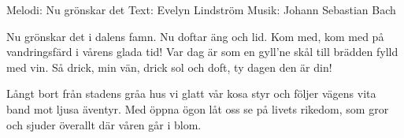 \begin{song}

\begin{songmeta}
Melodi: Nu grönskar det
Text: Evelyn Lindström
Musik: Johann Sebastian Bach
\end{songmeta}

\begin{songtext}
Nu grönskar det i dalens famn.
Nu doftar äng och lid.
Kom med, kom med på vandringsfärd
i vårens glada tid!
Var dag är som en gyll'ne skål
till brädden fylld med vin.
Så drick, min vän, drick sol och doft,
ty dagen den är din!

Långt bort från stadens gråa hus
vi glatt vår kosa styr
och följer vägens vita band
mot ljusa äventyr.
Med öppna ögon låt oss se
på livets rikedom,
som gror och sjuder överallt
där våren går i blom.
\end{songtext}
\end{song}
